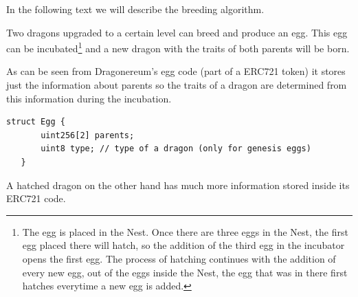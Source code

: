 \documentclass[12pt]{article}
\begin{document}
In the following text we will describe the breeding algorithm.\par

Two dragons upgraded to a certain level can breed and produce an egg. This egg can be incubated\footnote{The egg is placed in the Nest. Once there are three eggs in the Nest, the first egg placed there will hatch, so the addition of the third egg in the incubator opens the first egg. The process of hatching continues with the addition of every new egg, out of the eggs inside the Nest, the egg that was in there first hatches everytime a new egg is added.}  and a new dragon with the traits of both parents will be born.\par

As can be seen from Dragonereum’s egg code (part of a ERC721 token) it stores just the information about parents so the traits of a dragon are determined from this information during the incubation.\par



\begin{footnotesize}
\begin{verbatim}
struct Egg {
       uint256[2] parents;
       uint8 type; // type of a dragon (only for genesis eggs)
   }

\end{verbatim}
\end{footnotesize}

A hatched dragon on the other hand has much more information stored inside its ERC721 code.\par
\end{document}
